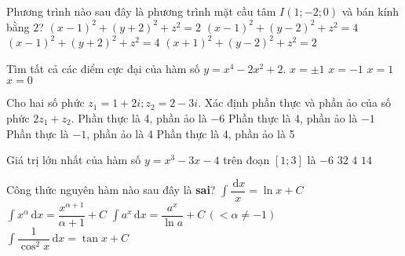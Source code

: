 \begin{ex}%
	Phương trình nào sau đây là phương trình mặt cầu tâm $ I(1;-2;0) $ và bán kính bằng $ 2 $?	
	\choice
	{$ (x-1)^2+(y+2)^2+z^2=2 $}
	{$ (x-1)^2+(y-2)^2+z^2=4 $}
	{\True $ (x-1)^2+(y+2)^2+z^2=4 $}
	{$ (x+1)^2+(y-2)^2+z^2=2 $}
\end{ex}
\begin{ex}%
	Tìm tất cả các điểm cực đại của hàm số $y=x^4-2x^2+2$.
	\choice
	{$x=\pm 1$}
	{$x=-1$}
	{$x=1$}
	{\True $x=0$}
\end{ex}
\begin{ex}%
	Cho hai số phức $z_1=1+2i; z_2=2-3i$. Xác định phần thực và phần ảo của số phức
	$2z_1+z_2$.
	\choice 
	{ Phần thực là 4, phần ảo là $-6$}
	{\True Phần thực là 4, phần ảo là $-1$}
	{ Phần thực là $-1$, phần ảo là 4}
	{ Phần thực là 4, phần ảo là 5}
\end{ex}
\begin{ex}%
	Giá trị lớn nhất của hàm số $y=x^3-3x-4$ trên đoạn $\left[1;3\right]$ là
	\choice
	{$-6$}
	{$32$}
	{$4$}
	{\True $14$}
\end{ex}
\begin{ex}%
	Công thức nguyên hàm nào sau đây là \textbf{sai}?
	\choice
	{\True $\displaystyle \int \dfrac{\mathrm{\, d}x}{x}=\ln x +C$}
	{$\displaystyle \int x^\alpha \mathrm{\, d}x = \dfrac{x^{\alpha+1}}{\alpha+1}+C$}
	{$\displaystyle \int a^x\mathrm{\, d}x=\dfrac{a^x}{\ln a}+C \, (<\alpha \neq -1)$}
	{$\displaystyle \int \dfrac{1}{\cos^2x}\mathrm{\, d}x=\tan x +C$}
\end{ex}
